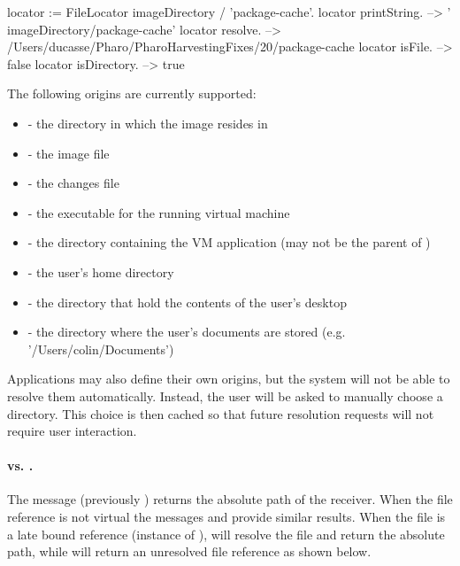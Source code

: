 \documentclass[a4paper,10pt,twoside]{book}
\begin{document}
\begin{code}{}
    locator := FileLocator imageDirectory / 'package-cache'.
    locator printString.             --> ' {imageDirectory}/package-cache'
    locator resolve.                 -->  /Users/ducasse/Pharo/PharoHarvestingFixes/20/package-cache
    locator isFile.                  --> false
    locator isDirectory.             --> true
\end{code}	

The following origins are currently supported:

\begin{itemize}
\item {} - the directory in which the image resides in
\item{} - the image file
\item{} - the changes file
\item{} - the executable for the running virtual machine
\item{} - the directory containing the VM application (may not be the parent of )
\item{} - the user's home directory
\item{} - the directory that hold the contents of the user's desktop
\item{} - the directory where the user's documents are stored (e.g. '/Users/colin/Documents')
\end{itemize}

Applications may also define their own origins, but the system will not be able to resolve them automatically. Instead, the user will be asked to manually choose a directory. This choice is then cached so that future resolution requests will not require user interaction.

\paragraph{ vs. .} The message   (previously ) returns the absolute path of the receiver. When the file reference is not virtual the messages  and  provide similar results.
When the file is a late bound reference (instance of ),  will resolve the file and return the absolute path, while  will return an unresolved file reference as shown below.
\end{document}
